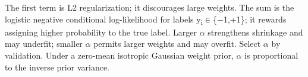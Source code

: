 The first term is L2 regularization; it discourages large weights. The sum is the logistic negative conditional log-likelihood for labels y\textsubscript{i}\ensuremath{\in}\{\ensuremath{-}1,+1\}; it rewards assigning higher probability to the true label. Larger \ensuremath{\alpha} strengthens shrinkage and may underfit; smaller \ensuremath{\alpha} permits larger weights and may overfit. Select \ensuremath{\alpha} by validation. Under a zero-mean isotropic Gaussian weight prior, \ensuremath{\alpha} is proportional to the inverse prior variance.
